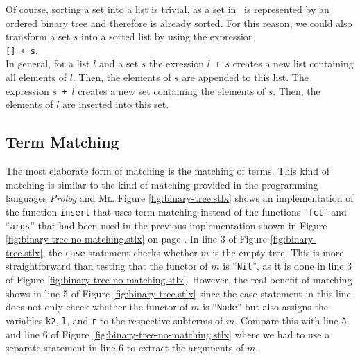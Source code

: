 Of course, sorting a set into a list is trivial, as a
set in \setlx\ is represented by an ordered binary tree and therefore is already sorted.
For this reason, we could also transform a set $s$ into a sorted list by using the expression
\\[0.2cm]
\hspace*{1.3cm}
\texttt{[] + s}.
\\[0.2cm]
In general, for a list $l$ and a set $s$ the exression \texttt{$l$ + $s$} creates a new
list containing all elements of $l$.  Then, the elements of $s$ are appended to this
list.  The expression \texttt{$s$ + $l$} creates a new set containing the elements of
$s$.  Then, the elements of $l$ are inserted into this set.


\subsection{Term Matching}
The most elaborate form of matching is the matching of terms.  This kind of matching is similar to
the kind of matching provided in the programming languages \textsl{Prolog} and \textsc{Ml}.
Figure \ref{fig:binary-tree.stlx} shows an implementation of the function \texttt{insert} that uses
term matching instead of the functions ``\texttt{fct}'' and ``\texttt{args}'' that had been used in
the previous implementation shown in Figure \ref{fig:binary-tree-no-matching.stlx} on page
\pageref{fig:binary-tree-no-matching.stlx}.  In line 3 of Figure \ref{fig:binary-tree.stlx}, the
\texttt{case} statement checks whether $m$ is the empty tree.  This is more straightforward than
testing that the functor of $m$ is ``\texttt{Nil}'', as it is done in line 3 of Figure
\ref{fig:binary-tree-no-matching.stlx}.  However, the real benefit of matching shows in line 5 of
Figure \ref{fig:binary-tree.stlx} since the case statement in this line does not only check whether
the functor of $m$ is ``\texttt{Node}'' but also assigns the variables \texttt{k2}, \texttt{l}, and
\texttt{r} to the respective subterms of $m$.  Compare this with line 5 and line 6 of Figure
\ref{fig:binary-tree-no-matching.stlx} where we had to use a separate statement in line 6 to extract
the arguments of $m$.


